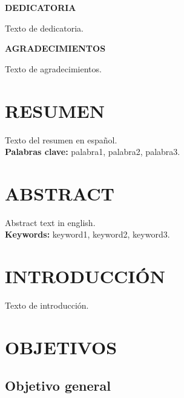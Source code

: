 \documentclass[10pt]{report}
\begin{document}
\begin{titlepage}
\begin{center}
    {\bfseries\large DEDICATORIA \par}
\end{center}
\raggedleft
Texto de dedicatoria.
\end{titlepage}

\begin{titlepage}
\begin{center}
    {\bfseries\large AGRADECIMIENTOS \par}
\end{center}
Texto de agradecimientos.
\end{titlepage}

\tableofcontents
\listoffigures
\renewcommand{\listtablename}{Índice de tablas}
\listoftables

\chapter*{RESUMEN}

Texto del resumen en español.\\

\textbf{Palabras clave:} palabra1, palabra2, palabra3.

\chapter*{ABSTRACT}

Abstract text in english.\\

\textbf{Keywords:} keyword1, keyword2, keyword3.


\chapter{INTRODUCCIÓN}

Texto de introducción.

\chapter{OBJETIVOS}

\section{Objetivo general}
\end{document}
